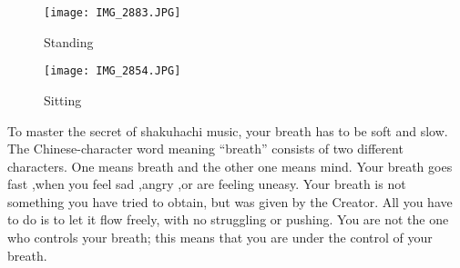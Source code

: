 ﻿\begin{figure}
\centering
\begin{minipage}{0.4\textwidth}
\centering
\texttt{[image: IMG\_2883.JPG]}
\caption{Standing} \label{fig:standing}
\end{minipage}
\hfill
\begin{minipage}{0.4\textwidth}
\centering
\texttt{[image: IMG\_2854.JPG]}
\caption{Sitting} \label{fig:sitting}
\end{minipage}
\end{figure}

To master the secret of shakuhachi music, your breath has to be soft and slow.
The Chinese-character word meaning “breath” consists of two different characters.
One means breath and the other one means mind.
Your breath goes fast ,when you feel sad ,angry ,or are feeling uneasy.
Your breath is not something you have tried to obtain, but was given by the Creator.
All you have to do is to let it flow freely, with no struggling or pushing.
You are not the one who controls your breath; this means that you are under the control of your breath.


